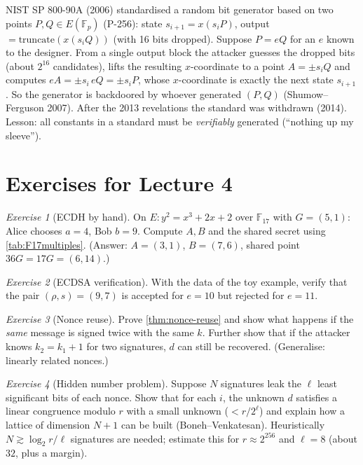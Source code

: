 \documentclass[11pt,a4paper,oneside]{book}
\theoremstyle{plain}
\theoremstyle{definition}
\theoremstyle{remark}
\newtheorem{exercise}{Exercise}[chapter]
\newcommand{\F}{\mathbb{F}}
\begin{document}
\begin{keyidea}
NIST SP 800-90A (2006) standardised a random bit generator based on two points $P,Q\in E(\F_p)$ (P-256): state $s_{i+1}=x(s_iP)$, output $=\text{truncate}(x(s_iQ))$ (with 16 bits dropped). Suppose $P=eQ$ for an $e$ known to the designer. From a single output block the attacker guesses the dropped bits (about $2^{16}$ candidates), lifts the resulting $x$-coordinate to a point $A=\pm s_iQ$ and computes $eA=\pm s_i\,eQ=\pm s_iP$, whose $x$-coordinate is exactly the next state $s_{i+1}$. So the generator is backdoored by whoever generated $(P,Q)$ (Shumow--Ferguson 2007). After the 2013 revelations the standard was withdrawn (2014). Lesson: all constants in a standard must be \emph{verifiably} generated (``nothing up my sleeve'').
\end{keyidea}

\section*{Exercises for Lecture 4}

\begin{exercise}[ECDH by hand]
On $E:y^2=x^3+2x+2$ over $\F_{17}$ with $G=(5,1)$: Alice chooses $a=4$, Bob $b=9$. Compute $A,B$ and the shared secret using \cref{tab:F17multiples}. (Answer: $A=(3,1)$, $B=(7,6)$, shared point $36G=17G=(6,14)$.)
\end{exercise}

\begin{exercise}[ECDSA verification]
With the data of the toy example, verify that the pair $(\rho,s)=(9,7)$ is accepted for $e=10$ but rejected for $e=11$.
\end{exercise}

\begin{exercise}[Nonce reuse]
Prove \cref{thm:nonce-reuse} and show what happens if the \emph{same} message is signed twice with the same $k$. Further show that if the attacker knows $k_2=k_1+1$ for two signatures, $d$ can still be recovered. (Generalise: linearly related nonces.)
\end{exercise}

\begin{exercise}[Hidden number problem]
Suppose $N$ signatures leak the $\ell$ least significant bits of each nonce. Show that for each $i$, the unknown $d$ satisfies a linear congruence modulo $r$ with a small unknown ($<r/2^\ell$) and explain how a lattice of dimension $N+1$ can be built (Boneh--Venkatesan). Heuristically $N\gtrsim\log_2 r/\ell$ signatures are needed; estimate this for $r\approx2^{256}$ and $\ell=8$ (about $32$, plus a margin).
\end{exercise}
\end{document}
